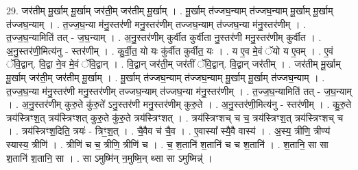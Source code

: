 \documentclass[17pt]{extarticle}
\begin{document}
29. जर॑तीम् मू॒र्खाम् मू॒र्खाम् जर॑ती॒म् जर॑तीम् मू॒र्खाम् । . मू॒र्खाम् त॑ज्जघ॒न्याम् त॑ज्जघ॒न्याम् मू॒र्खाम् मू॒र्खाम् त॑ज्जघ॒न्याम् । . त॒ज्ज॒घ॒न्या म॑नु॒स्तर॑णी मनु॒स्तर॑णीम् तज्जघ॒न्याम् त॑ज्जघ॒न्या म॑नु॒स्तर॑णीम् । . त॒ज्ज॒घ॒न्यामिति॑ तत् - ज॒घ॒न्याम् । . अ॒नु॒स्तर॑णीम् कुर्वीत कुर्वीता नु॒स्तर॑णी मनु॒स्तर॑णीम् कुर्वीत । . अ॒नु॒स्तर॑णी॒मित्य॑नु - स्तर॑णीम् । . कु॒र्वी॒त॒ यो यः कु॑र्वीत कुर्वीत॒ यः । . य ए॒व मे॒वं ॅयो य ए॒वम् । . ए॒वं ॅवि॒द्वान्. वि॒द्वा ने॒व मे॒वं ॅवि॒द्वान् । . वि॒द्वान् जर॑ती॒म् जर॑तीं ॅवि॒द्वान्. वि॒द्वान् जर॑तीम् । . जर॑तीम् मू॒र्खाम् मू॒र्खाम् जर॑ती॒म् जर॑तीम् मू॒र्खाम् । . मू॒र्खाम् त॑ज्जघ॒न्याम् त॑ज्जघ॒न्याम् मू॒र्खाम् मू॒र्खाम् त॑ज्जघ॒न्याम् । . त॒ज्ज॒घ॒न्या म॑नु॒स्तर॑णी मनु॒स्तर॑णीम् तज्जघ॒न्याम् त॑ज्जघ॒न्या म॑नु॒स्तर॑णीम् । . त॒ज्ज॒घ॒न्यामिति॑ तत् - ज॒घ॒न्याम् । . अ॒नु॒स्तर॑णीम् कुरु॒ते कु॑रु॒ते॑ ऽनु॒स्तर॑णी मनु॒स्तर॑णीम् कुरु॒ते । . अ॒नु॒स्तर॑णी॒मित्य॑नु - स्तर॑णीम् । . कु॒रु॒ते त्रय॑स्त्रिꣳश॒त् त्रय॑स्त्रिꣳशत् कुरु॒ते कु॑रु॒ते त्रय॑स्त्रिꣳशत् । . त्रय॑स्त्रिꣳशच् च च॒ त्रय॑स्त्रिꣳश॒त् त्रय॑स्त्रिꣳशच् च । . त्रय॑स्त्रिꣳश॒दिति॒ त्रयः॑ - त्रिꣳ॒॒श॒त् । . चै॒वैव च॑ चै॒व । . ए॒वास्या᳚ स्यै॒वै वास्य॑ । . अ॒स्य॒ त्रीणि॒ त्रीण्य॑ स्यास्य॒ त्रीणि॑ । . त्रीणि॑ च च॒ त्रीणि॒ त्रीणि॑ च । . च॒ श॒तानि॑ श॒तानि॑ च च श॒तानि॑ । . श॒तानि॒ सा सा श॒तानि॑ श॒तानि॒ सा । . सा ऽमुष्मि॑न् न॒मुष्मि॒न् थ्सा सा ऽमुष्मिन्न्॑ । \newline
\end{document}
